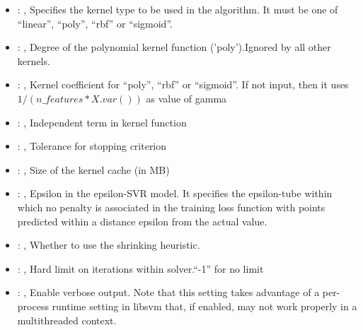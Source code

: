\begin{itemize}
    \item {}: ,
      Specifies the kernel type to be used in the algorithm. It must be one of
      ``linear'', ``poly'', ``rbf'' or ``sigmoid''.

    \item {}: ,
      Degree of the polynomial kernel function ('poly').Ignored by all other kernels.

    \item {}: ,
      Kernel coefficient for ``poly'', ``rbf'' or ``sigmoid''. If not input, then it uses
      $1 / (n\_features * X.var())$ as value of gamma

    \item {}: ,
      Independent term in kernel function

    \item {}: ,
      Tolerance for stopping criterion

    \item {}: ,
      Size of the kernel cache (in MB)

    \item {}: ,
      Epsilon in the epsilon-SVR model. It specifies the epsilon-tube
      within which no penalty is associated in the training loss function
      with points predicted within a distance epsilon from the actual
      value.

    \item {}: ,
      Whether to use the shrinking heuristic.

    \item {}: ,
      Hard limit on iterations within solver.``-1'' for no limit

    \item {}: ,
      Enable verbose output. Note that this setting takes advantage
      of a per-process runtime setting in libsvm that, if enabled, may not
      work properly in a multithreaded context.
  \end{itemize}


